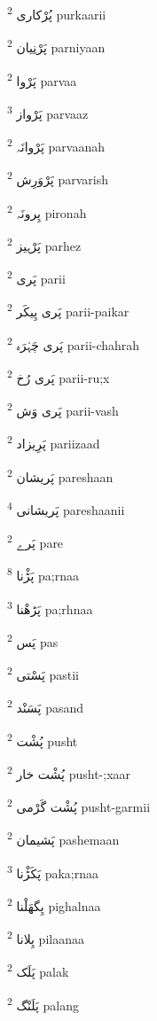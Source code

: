 \documentclass[12pt]{article}
\begin{document}
\begin{multicols}{5}
{\ur پُرْکاری}   \textsuperscript{2} purkaarii

{\ur پَرْنِیان}   \textsuperscript{2} parniyaan

{\ur پَرْوا}   \textsuperscript{2} parvaa

{\ur پَرْواز}   \textsuperscript{3} parvaaz

{\ur پَرْوانَہ}   \textsuperscript{2} parvaanah

{\ur پَرْوَرِش}   \textsuperscript{2} parvarish

{\ur پِرونَہ}   \textsuperscript{2} pironah

{\ur پَرْہیز}   \textsuperscript{2} parhez

{\ur پَری}   \textsuperscript{2} parii

{\ur پَری پِیکَر}   \textsuperscript{2} parii-paikar

{\ur پَری چَہْرَہ}   \textsuperscript{2} parii-chahrah

{\ur پَری رُخ}   \textsuperscript{2} parii-ru;x

{\ur پَری وَش}   \textsuperscript{2} parii-vash

{\ur پَرِیزاد}   \textsuperscript{2} pariizaad

{\ur پَریشان}   \textsuperscript{2} pareshaan

{\ur پَریشانی}   \textsuperscript{4} pareshaanii

{\ur پَرے}   \textsuperscript{2} pare

{\ur پَڑْنا}   \textsuperscript{8} pa;rnaa

{\ur پَڑھْنا}   \textsuperscript{3} pa;rhnaa

{\ur پَس}   \textsuperscript{2} pas

{\ur پَسْتی}   \textsuperscript{2} pastii

{\ur پَسَنْد}   \textsuperscript{2} pasand

{\ur پُشْت}   \textsuperscript{2} pusht

{\ur پُشْت خار}   \textsuperscript{2} pusht-;xaar

{\ur پُشْت گَرْمی}   \textsuperscript{2} pusht-garmii

{\ur پَشیمان}   \textsuperscript{2} pashemaan

{\ur پَکَڑْنا}   \textsuperscript{3} paka;rnaa

{\ur پِگھَلْنا}   \textsuperscript{2} pighalnaa

{\ur پِلانا}   \textsuperscript{2} pilaanaa

{\ur پَلَک}   \textsuperscript{2} palak

{\ur پَلَنْگ}   \textsuperscript{2} palang


\end{multicols}
\end{document}
